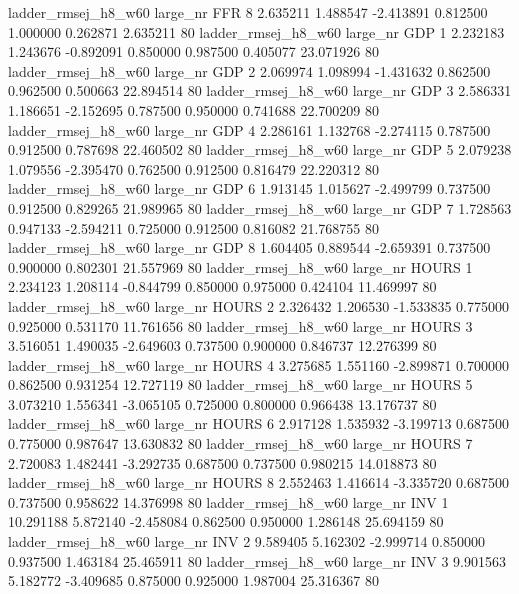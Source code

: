 ladder_rmsej_h8_w60   large_nr      FFR                 8  2.635211  1.488547  -2.413891 0.812500 1.000000  0.262871    2.635211 80
ladder_rmsej_h8_w60   large_nr      GDP                 1  2.232183  1.243676  -0.892091 0.850000 0.987500  0.405077   23.071926 80
ladder_rmsej_h8_w60   large_nr      GDP                 2  2.069974  1.098994  -1.431632 0.862500 0.962500  0.500663   22.894514 80
ladder_rmsej_h8_w60   large_nr      GDP                 3  2.586331  1.186651  -2.152695 0.787500 0.950000  0.741688   22.700209 80
ladder_rmsej_h8_w60   large_nr      GDP                 4  2.286161  1.132768  -2.274115 0.787500 0.912500  0.787698   22.460502 80
ladder_rmsej_h8_w60   large_nr      GDP                 5  2.079238  1.079556  -2.395470 0.762500 0.912500  0.816479   22.220312 80
ladder_rmsej_h8_w60   large_nr      GDP                 6  1.913145  1.015627  -2.499799 0.737500 0.912500  0.829265   21.989965 80
ladder_rmsej_h8_w60   large_nr      GDP                 7  1.728563  0.947133  -2.594211 0.725000 0.912500  0.816082   21.768755 80
ladder_rmsej_h8_w60   large_nr      GDP                 8  1.604405  0.889544  -2.659391 0.737500 0.900000  0.802301   21.557969 80
ladder_rmsej_h8_w60   large_nr    HOURS                 1  2.234123  1.208114  -0.844799 0.850000 0.975000  0.424104   11.469997 80
ladder_rmsej_h8_w60   large_nr    HOURS                 2  2.326432  1.206530  -1.533835 0.775000 0.925000  0.531170   11.761656 80
ladder_rmsej_h8_w60   large_nr    HOURS                 3  3.516051  1.490035  -2.649603 0.737500 0.900000  0.846737   12.276399 80
ladder_rmsej_h8_w60   large_nr    HOURS                 4  3.275685  1.551160  -2.899871 0.700000 0.862500  0.931254   12.727119 80
ladder_rmsej_h8_w60   large_nr    HOURS                 5  3.073210  1.556341  -3.065105 0.725000 0.800000  0.966438   13.176737 80
ladder_rmsej_h8_w60   large_nr    HOURS                 6  2.917128  1.535932  -3.199713 0.687500 0.775000  0.987647   13.630832 80
ladder_rmsej_h8_w60   large_nr    HOURS                 7  2.720083  1.482441  -3.292735 0.687500 0.737500  0.980215   14.018873 80
ladder_rmsej_h8_w60   large_nr    HOURS                 8  2.552463  1.416614  -3.335720 0.687500 0.737500  0.958622   14.376998 80
ladder_rmsej_h8_w60   large_nr      INV                 1 10.291188  5.872140  -2.458084 0.862500 0.950000  1.286148   25.694159 80
ladder_rmsej_h8_w60   large_nr      INV                 2  9.589405  5.162302  -2.999714 0.850000 0.937500  1.463184   25.465911 80
ladder_rmsej_h8_w60   large_nr      INV                 3  9.901563  5.182772  -3.409685 0.875000 0.925000  1.987004   25.316367 80
